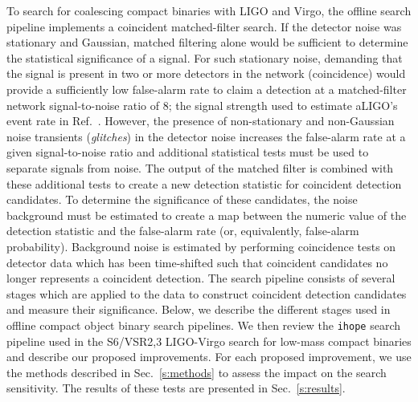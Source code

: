 \documentclass[12pt]{iopart} \usepackage{graphicx,amssymb}
\begin{document}
To search for coalescing compact binaries with LIGO and Virgo, the offline search
pipeline implements a coincident matched-filter search.  If the detector noise
was stationary and Gaussian, matched filtering alone would be sufficient to
determine the statistical significance of a signal. For such stationary noise, 
demanding that the signal is present in two or more detectors in the network 
(coincidence) would provide a sufficiently low false-alarm rate to claim a 
detection at a matched-filter network signal-to-noise ratio of 8; the signal 
strength used to estimate aLIGO's event rate in Ref.~\cite{Abadie:2010cf}.
However, the presence of non-stationary and non-Gaussian noise
transients (\emph{glitches})
in the detector noise increases the false-alarm rate at a given
signal-to-noise ratio and additional statistical tests must be used to separate
signals from noise. The output of the matched filter is combined with these
additional tests to create a new detection statistic for coincident detection
candidates. To determine the significance of these candidates, the noise
background must be estimated to create a map between the numeric value of the
detection statistic and the false-alarm rate (or, equivalently, false-alarm
probability). Background noise is estimated by performing coincidence tests on
detector data which has been time-shifted such that coincident candidates no
longer represents a coincident detection. The search pipeline consists of
several stages which are applied to the data to construct coincident detection
candidates and measure their significance.   Below, we describe the different
stages used in offline compact object binary search pipelines. We then review
the \texttt{ihope} search pipeline used in the S6/VSR2,3 LIGO-Virgo search for
low-mass compact binaries and describe our proposed improvements.  For each
proposed improvement, we use the methods described in Sec.~\ref{s:methods} to
assess the impact on the search sensitivity. The results of these tests are
presented in Sec.~\ref{s:results}.
\end{document}
